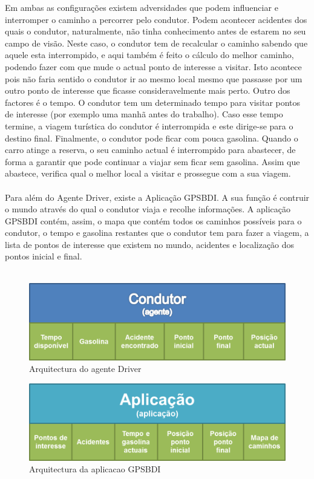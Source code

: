 \documentclass[15pt,a4paper]{article}
\begin{document}
Em ambas as configurações existem adversidades que podem influenciar e interromper o caminho a percorrer pelo condutor. Podem acontecer acidentes dos quais o condutor, naturalmente, não tinha conhecimento antes de estarem no seu campo de visão. Neste caso, o condutor tem de recalcular o caminho sabendo que aquele esta interrompido, e aqui também é feito o cálculo do melhor caminho, podendo fazer com que mude o actual ponto de interesse a visitar. Isto acontece pois não faria sentido o condutor ir ao mesmo local mesmo que passasse por um outro ponto de interesse que ficasse consideravelmente mais perto.
Outro dos factores é o tempo. O condutor tem um determinado tempo para visitar pontos de interesse (por exemplo uma manhã antes do trabalho). Caso esse tempo termine, a viagem turística do condutor é interrompida e este dirige-se para o destino final. Finalmente, o condutor pode ficar com pouca gasolina. Quando o carro atinge a reserva, o seu caminho actual é interrompido para abastecer, de forma a garantir que pode continuar a viajar sem ficar sem gasolina. Assim que abastece, verifica qual o melhor local a visitar e prossegue com a sua viagem.\\\\Para além do Agente Driver, existe a Aplicação GPSBDI. A sua função é contruir o mundo através do qual o condutor viaja e recolhe informações. A aplicação GPSBDI contém, assim, o mapa que contém todos os caminhos possíveis para o condutor,  o tempo e gasolina restantes que o condutor tem para fazer a viagem, a lista de pontos de interesse que existem no mundo, acidentes e localização dos pontos inicial e final.\\\\

\begin{figure}[htp]
  \centering
  \includegraphics[scale=0.5]{diagrama_condutor.png}
  \caption{Arquitectura do agente Driver}
\end{figure}

\begin{figure}[htp]
  \centering
  \includegraphics[scale=0.5]{diagrama_aplicacao.png}
  \caption{Arquitectura da aplicacao GPSBDI}
\end{figure}
\end{document}

